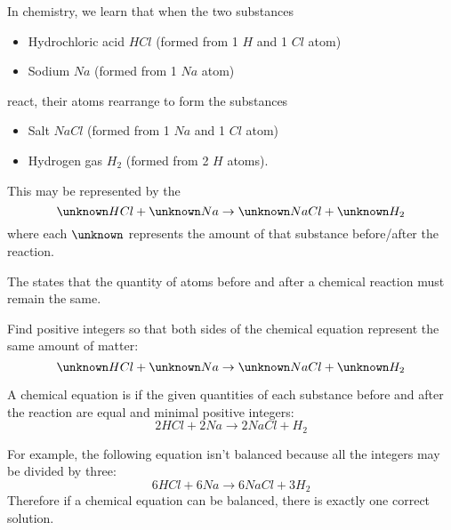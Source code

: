 
\begin{applicationActivities}

\begin{definition}
  In chemistry, we learn that when the two substances
  \begin{itemize}
    \item Hydrochloric acid \(HCl\) (formed from 1 \(H\) and 1 \(Cl\) atom)
    \item Sodium \(Na\) (formed from 1 \(Na\) atom)
  \end{itemize}
  react, their atoms rearrange to form the substances
  \begin{itemize}
    \item Salt \(NaCl\) (formed from 1 \(Na\) and 1 \(Cl\) atom)
    \item Hydrogen gas \(H_2\) (formed from 2 \(H\) atoms).
  \end{itemize}

  This may be represented by the 
  \[
    \unknown HCl + \unknown Na
      \rightarrow
    \unknown NaCl + \unknown H_2
  \]
  where each \(\unknown\) represents the amount of that substance before/after
  the reaction.
\end{definition}

\begin{activity}{5}
  The  states that the quantity of
  atoms before and after a chemical reaction must remain the same.

  \vspace{1em}

  Find positive integers so that both sides of the chemical equation represent
  the same amount of matter:
  \[
    \unknown HCl + \unknown Na
      \rightarrow
    \unknown NaCl + \unknown H_2
  \]
\end{activity}

\begin{definition}
  A chemical equation is  if the given quantities of each
  substance before and after the reaction are equal and minimal positive
  integers:
  \[
    2 HCl + 2 Na
      \rightarrow
    2 NaCl + H_2
  \]
\end{definition}

\begin{observation}
  For example, the following equation isn't balanced because all the integers
  may be divided by three:
  \[
    6 HCl + 6 Na
      \rightarrow
    6 NaCl + 3 H_2
  \]
  Therefore if a chemical equation can be balanced, there is exactly one
  correct solution.
\end{observation}


\end{applicationActivities}
